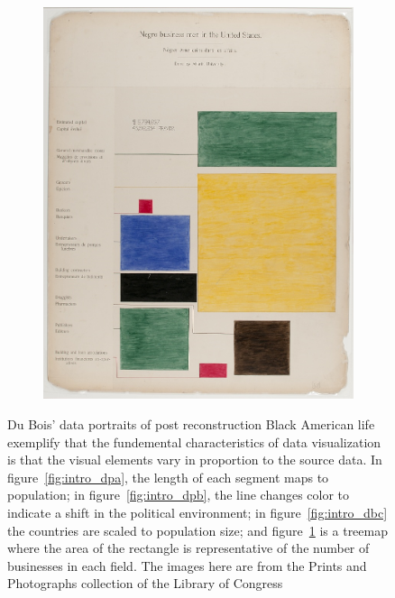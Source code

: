 \begin{figure}[H]
\begin{subfigure}{.24\textwidth}
        \includegraphics[width=1\textwidth]{figures/intro/du_bois_heat.png}
        \caption{}
        \label{fig:intro_dbd}
    \end{subfigure}
    \caption{Du Bois' data portraits\cite{duboiscenterattheuniversityofmassachusettsBoisDataPortraits2018} of post reconstruction Black American life exemplify that the fundemental characteristics of data visualization is that the visual elements vary in proportion to the source data. In figure~\ref{fig:intro_dpa}, the length of each segment maps to population; in figure~\ref{fig:intro_dpb}, the line changes color to indicate a shift in the political environment; in figure~\ref{fig:intro_dbc} the countries are scaled to population size; and figure~\ref{fig:intro_dbd} is a treemap where the area of the rectangle is representative of the number of businesses in each field. The images here are from the Prints and Photographs collection of the Library of Congress \cite{duboisGeorgiaNegroCity1900,duboisGeorgiaNegroValuation1900, duboisSeriesStatisticalCharts, duboisSeriesStatisticalChartsa}}
    \label{fig:intro_dubois}
\end{figure}

